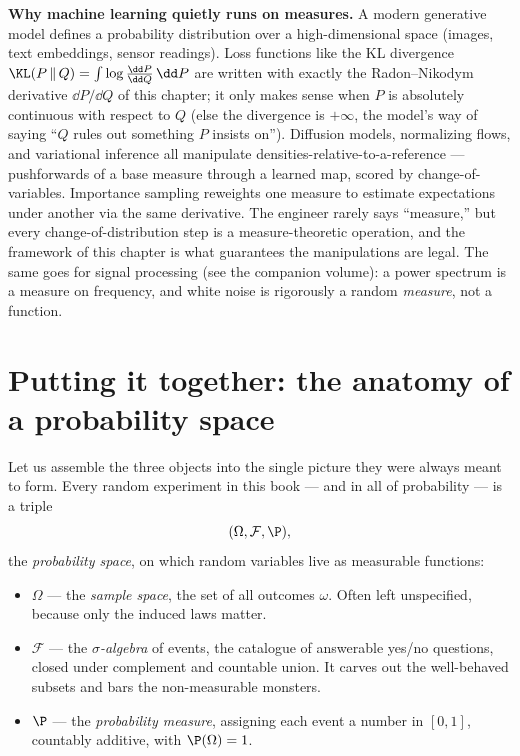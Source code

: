 \begin{applicationbox}
\textbf{Why machine learning quietly runs on measures.} A modern generative model
defines a probability distribution over a high-dimensional space (images, text
embeddings, sensor readings). Loss functions like the KL divergence
$\KL(P \,\|\, Q) = \int \log\frac{\dd P}{\dd Q}\,\dd P$ are written with exactly the
Radon--Nikodym derivative $\dd P/\dd Q$ of this chapter; it only makes sense when
$P$ is absolutely continuous with respect to $Q$ (else the divergence is
$+\infty$, the model's way of saying ``$Q$ rules out something $P$ insists on'').
Diffusion models, normalizing flows, and variational inference all manipulate
densities-relative-to-a-reference --- pushforwards of a base measure through a
learned map, scored by change-of-variables. Importance sampling reweights one
measure to estimate expectations under another via the same derivative. The
engineer rarely says ``measure,'' but every change-of-distribution step is a
measure-theoretic operation, and the framework of this chapter is what guarantees
the manipulations are legal. The same goes for signal processing (see the
companion volume): a power spectrum is a measure on frequency, and white noise is
rigorously a random \emph{measure}, not a function.
\end{applicationbox}

\section{Putting it together: the anatomy of a probability space}
\label{ch36:anatomy}

Let us assemble the three objects into the single picture they were always meant to
form. Every random experiment in this book --- and in all of probability --- is a
triple
\[
  (\Omega, \mathcal{F}, \P),
\]
the \emph{probability space}, on which random variables live as measurable
functions:

\begin{itemize}
  \item $\Omega$ --- the \emph{sample space}, the set of all outcomes $\omega$.
        Often left unspecified, because only the induced laws matter.
  \item $\mathcal{F}$ --- the \emph{$\sigma$-algebra} of events, the catalogue of
        answerable yes/no questions, closed under complement and countable union.
        It carves out the well-behaved subsets and bars the non-measurable monsters.
  \item $\P$ --- the \emph{probability measure}, assigning each event a number in
        $[0,1]$, countably additive, with $\P(\Omega) = 1$.
\end{itemize}

